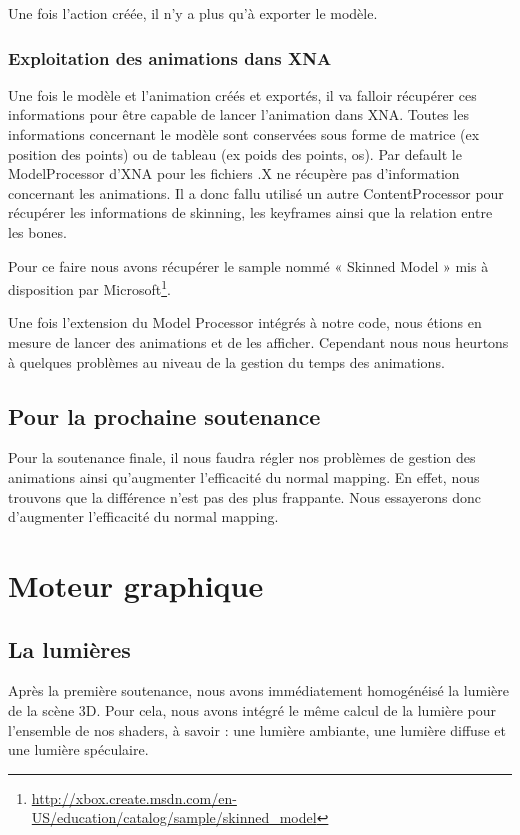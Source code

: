 \documentclass[11pt]{report}
\begin{document}
Une fois l’action créée, il n’y a plus qu’à exporter le modèle.

\subsubsection{Exploitation des animations dans XNA}

Une fois le modèle et l’animation créés et exportés, il va falloir récupérer ces informations pour être capable de lancer l’animation dans XNA. Toutes les informations concernant le modèle sont conservées sous forme de matrice (ex position des points) ou de tableau (ex poids des points, os). 
Par default le ModelProcessor d’XNA pour les fichiers .X ne récupère pas d’information concernant les animations. Il a donc fallu utilisé un autre ContentProcessor pour récupérer les informations de skinning, les  keyframes ainsi que la relation entre les bones.

Pour ce faire nous avons récupérer le sample nommé « Skinned Model » mis à disposition par Microsoft\footnote{\url{http://xbox.create.msdn.com/en-US/education/catalog/sample/skinned_model}}.

Une fois l’extension du Model Processor intégrés à notre code, nous étions en mesure de lancer des animations et de les afficher. Cependant nous nous heurtons à quelques problèmes au niveau de la gestion du temps des animations.

\subsection{Pour la prochaine soutenance}

Pour la soutenance finale, il nous faudra régler nos problèmes de gestion des animations ainsi qu'augmenter l'efficacité du normal mapping. En effet, nous trouvons que la différence n'est pas des plus frappante. Nous essayerons donc d'augmenter l'efficacité du normal mapping.

\newpage
\section{Moteur graphique}

\subsection{La lumières}

Après la première soutenance, nous avons immédiatement homogénéisé la lumière de la scène 3D. Pour cela, nous avons intégré le même calcul de la lumière pour l'ensemble de nos shaders, à savoir : une lumière ambiante, une lumière diffuse et une lumière spéculaire.
\end{document}
